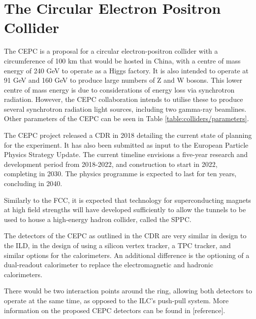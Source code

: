 
\section{The Circular Electron Positron Collider}
The \acrfull{CEPC} is a proposal for a circular electron-positron collider with a circumference of 100 km that would be hosted in China, with a centre of mass energy of 240 GeV to operate as a Higgs factory. It is also intended to operate at 91 GeV and 160 GeV to produce large numbers of Z and W bosons. This lower centre of mass energy is due to considerations of energy loss via synchrotron radiation. However, the \acrshort{CEPC} collaboration intends to utilise these to produce several synchrotron radiation light sources, including two gamma-ray beamlines. Other parameters of the \acrshort{CEPC} can be seen in Table \ref{table:colliders/parameters}.

The \acrshort{CEPC} project released a \acrfull{CDR} in 2018 detailing the current state of planning for the experiment. It has also been submitted as input to the European Particle Physics Strategy Update. The current timeline envisions a five-year research and development period from 2018-2022, and construction to start in 2022, completing in 2030. The physics programme is expected to last for ten years, concluding in 2040. 

Similarly to the \acrshort{FCC}, it is expected that technology for superconducting magnets at high field strengths will have developed sufficiently to allow the tunnels to be used to house a high-energy hadron collider, called the \acrfull{SPPC}. 

The detectors of the \acrshort{CEPC} as outlined in the \acrshort{CDR} are very similar in design to the \acrshort{ILD}, in the design of using a silicon vertex tracker, a \acrshort{TPC} tracker, and similar options for the calorimeters. An additional difference is the optioning of a dual-readout calorimeter to replace the electromagnetic and hadronic calorimeters. 

There would be two interaction points around the ring, allowing both detectors to operate at the same time, as opposed to the \acrshort{ILC}'s push-pull system. More information on the proposed \acrshort{CEPC} detectors can be found in [reference].

